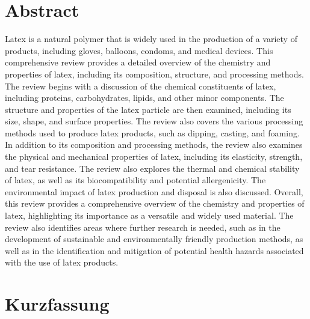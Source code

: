 \section*{Abstract}

Latex is a natural polymer that is widely used in the production of a variety of products, including gloves, balloons, condoms, and medical devices.
This comprehensive review provides a detailed overview of the chemistry and properties of latex, including its composition, structure, and processing methods.
The review begins with a discussion of the chemical constituents of latex, including proteins, carbohydrates, lipids, and other minor components.
The structure and properties of the latex particle are then examined, including its size, shape, and surface properties.
The review also covers the various processing methods used to produce latex products, such as dipping, casting, and foaming.
In addition to its composition and processing methods, the review also examines the physical and mechanical properties of latex, including its elasticity, strength, and tear resistance.
The review also explores the thermal and chemical stability of latex, as well as its biocompatibility and potential allergenicity.
The environmental impact of latex production and disposal is also discussed.
Overall, this review provides a comprehensive overview of the chemistry and properties of latex, highlighting its importance as a versatile and widely used material.
The review also identifies areas where further research is needed, such as in the development of sustainable and environmentally friendly production methods, as well as in the identification and mitigation of potential health hazards associated with the use of latex products.

\vfill

\section*{Kurzfassung}


